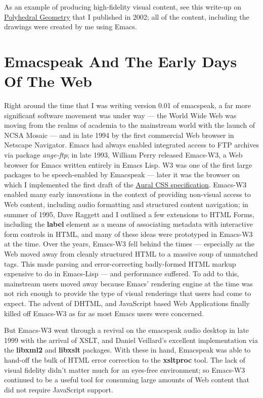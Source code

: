 \documentclass[11pt]{article}
\begin{document}
As an example of producing high-fidelity visual content, see this
write-up on
\href{http://emacspeak.sourceforge.net/raman/publications/polyhedra/}{Polyhedral
Geometry} that I published in 2002; all of the content,
including the drawings were created by me using Emacs.

\section{Emacspeak And The Early Days Of The Web}
\label{sec-7}

Right around the time that I was writing version 0.01 of
emacspeak, a far more significan\'t software movement was under way
— the World Wide Web was moving from the realms of academia to
the mainstream world with the launch of NCSA Mosaic — and in late
1994 by the first commercial Web browser in Netscape
Navigator. Emacs had always enabled integrated access to FTP
archives via package \emph{ange-ftp}; in late 1993, William Perry
released Emacs-W3, a Web browser for Emacs written entirely in
Emacs Lisp. W3 was one of the first large packages to be
speech-enabled by Emacspeak — later it was the browser on which I
implemented the first draft of the
\href{http://www.w3.org/TR/CSS2/aural.html}{Aural CSS
specification}. Emacs-W3 enabled many early innovations in the
context of providing non-visual access to Web content, including
audio formatting and structured content navigation; in summer of
1995, Dave Raggett and I outlined a few extensions to HTML Forms,
including the \textbf{label} element as a means of associating metadata
with interactive form controls in HTML, and many of these ideas
were prototyped in Emacs-W3 at the time. Over the years, Emacs-W3
fell behind the times — especially as the Web moved away from
cleanly structured HTML to a massive soup of unmatched tags. This
made parsing and error-correcting badly-formed HTML markup
expensive to do in Emacs-Lisp — and performance suffered. To add
to this, mainstream users moved away because Emacs' rendering
engine at the time was not rich enough to provide the type of
visual renderings that users had come to expect. The advent of
DHTML, and JavaScript based Web Applications finally killed off
Emacs-W3 as far as most Emacs users were concerned.

But Emacs-W3 went through a revival on the emacspeak audio
desktop in late 1999 with the arrival of XSLT, and Daniel
Veillard's excellent implementation via the \textbf{libxml2} and
\textbf{libxslt} packages. With these in hand, Emacspeak was able to
hand-off the bulk of HTML error correction to the \textbf{xsltproc}
tool. The lack of visual fidelity didn't matter much for an
eyes-free environment; so Emacs-W3 continued to be a useful tool
for consuming large amounts of Web content that did not require
JavaScript support.
\end{document}
